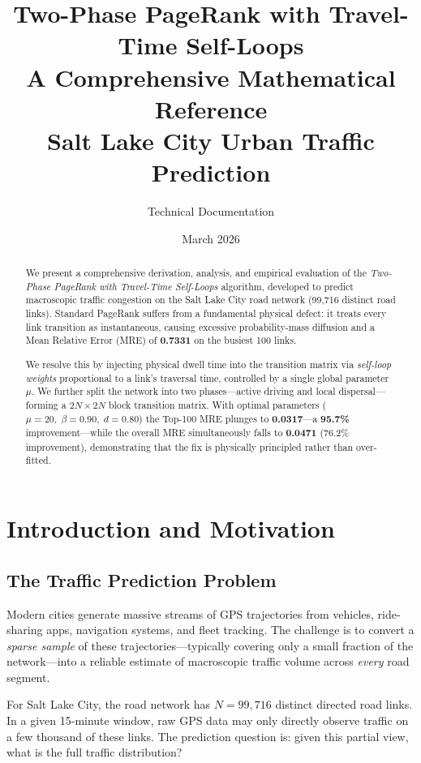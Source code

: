 \documentclass[12pt,a4paper]{article}
\title{%
  \textbf{Two-Phase PageRank with Travel-Time Self-Loops}\\[4pt]
  \large A Comprehensive Mathematical Reference\\[2pt]
  \normalsize Salt Lake City Urban Traffic Prediction
}
\author{Technical Documentation}
\date{March 2026}
\theoremstyle{definition}
\theoremstyle{plain}
\begin{document}
\maketitle
\begin{abstract}
We present a comprehensive derivation, analysis, and empirical evaluation of the
\emph{Two-Phase PageRank with Travel-Time Self-Loops} algorithm, developed to predict
macroscopic traffic congestion on the Salt Lake City road network (99{,}716 distinct road
links). Standard PageRank suffers from a fundamental physical defect: it treats every
link transition as instantaneous, causing excessive probability-mass diffusion and a Mean
Relative Error (MRE) of \textbf{0.7331} on the busiest 100 links.

We resolve this by injecting physical dwell time into the transition matrix via
\emph{self-loop weights} proportional to a link's traversal time, controlled by a single
global parameter $\mu$. We further split the network into two phases---active driving and
local dispersal---forming a $2N\!\times\!2N$ block transition matrix. With optimal
parameters ($\mu=20,\;\beta=0.90,\;d=0.80$) the Top-100 MRE plunges to
\textbf{0.0317}---a \textbf{95.7\%} improvement---while the overall MRE simultaneously
falls to \textbf{0.0471} (76.2\% improvement), demonstrating that the fix is physically
principled rather than over-fitted.
\end{abstract}

\tableofcontents
\newpage

\section{Introduction and Motivation}

\subsection{The Traffic Prediction Problem}

Modern cities generate massive streams of GPS trajectories from vehicles, ride-sharing
apps, navigation systems, and fleet tracking. The challenge is to convert a \emph{sparse
sample} of these trajectories---typically covering only a small fraction of the
network---into a reliable estimate of macroscopic traffic volume across \emph{every} road
segment.

For Salt Lake City, the road network has $N = 99{,}716$ distinct directed road links.
In a given 15-minute window, raw GPS data may only directly observe traffic on a few
thousand of these links. The prediction question is: given this partial view, what is the
full traffic distribution?
\end{document}
